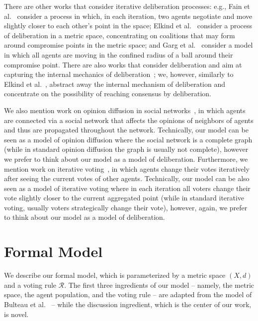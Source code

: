 \documentclass[runningheads,envcountsame]{llncs}
\begin{document}
There are other works that consider iterative deliberation processes:
  e.g., Fain et al.~\cite{fain2017sequential} consider a process in which, in each iteration, two agents negotiate and move slightly closer to each other's point in the space;
  Elkind et al.~\cite{elkind2021united} consider a process of deliberation in a metric space, concentrating on coalitions that may form around compromise points in the metric space;
  and Garg et al.~\cite{garg2019iterative} consider a model in which all agents are moving in the confined radius of a ball around their compromise point.
%
There are also works that consider deliberation and aim at capturing the internal mechanics of deliberation~\cite{austen2005deliberation,lizzeri2010sequential,austen2006deliberation}; we, however, similarly to Elkind et al.~\cite{elkind2021united}, abstract away the internal mechanism of deliberation and concentrate on the possibility of reaching consensus by deliberation.

We also mention work on opinion diffusion in social networks~\cite{grandi2017social,faliszewski2018opinion}, in which agents are connected via a social network that affects the opinions of neighbors of agents and thus are propagated throughout the network. Technically, our model can be seen as a model of opinion diffusion where the social network is a complete graph (while in standard opinion diffusion the graph is usually not complete), however we prefer to think about our model as a model of deliberation.
%
Furthermore, we mention work on iterative voting~\cite{meir2017iterative}, in which agents change their votes iteratively after seeing the current votes of other agents. Technically, our model can be also seen as a model of iterative voting where in each iteration all voters change their vote slightly closer to the current aggregated point (while in standard iterative voting, usually voters strategically change their vote), however, again, we prefer to think about our model as a model of deliberation.


\section{Formal Model}\label{section:formal model}

We describe our formal model, which is parameterized by a metric space $(X, d)$ and a voting rule $\mathcal{R}$. The first three ingredients of our model -- namely, the metric space, the agent population, and the voting rule -- are adapted from the model of Bulteau et al.~\cite{bulteau2021aggregation} -- while the discussion ingredient, which is the center of our work, is novel.
\end{document}
